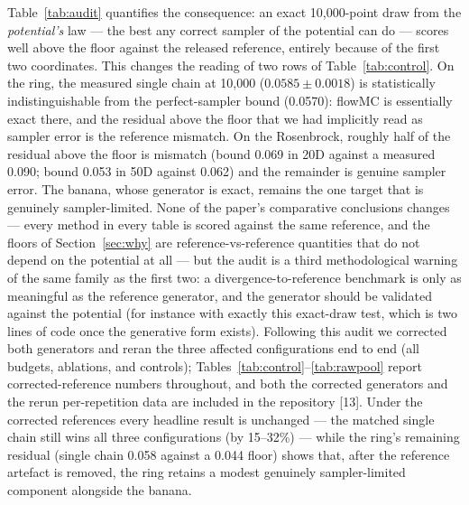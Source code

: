 \documentclass[11pt]{article}
\begin{document}
Table~\ref{tab:audit} quantifies the consequence: an exact 10{,}000-point
draw from the \emph{potential's} law --- the best any correct sampler of the
potential can do --- scores well above the floor against the released
reference, entirely because of the first two coordinates. This changes the
reading of two rows of Table~\ref{tab:control}. On the ring, the measured
single chain at 10{,}000 ($0.0585\pm0.0018$) is statistically
indistinguishable from the perfect-sampler bound (0.0570): flowMC is
essentially exact there, and the residual above the floor that we had
implicitly read as sampler error is the reference mismatch. On the Rosenbrock,
roughly half of the residual above the floor is mismatch (bound 0.069 in 20D
against a measured 0.090; bound 0.053 in 50D against 0.062) and the remainder
is genuine sampler error. The banana, whose generator is exact, remains the
one target that is genuinely sampler-limited. None of the paper's comparative
conclusions changes --- every method in every table is scored against the
same reference, and the floors of Section~\ref{sec:why} are
reference-vs-reference quantities that do not depend on the potential at all
--- but the audit is a third methodological warning of the same family as the
first two: a divergence-to-reference benchmark is only as meaningful as the
reference generator, and the generator should be validated against the
potential (for instance with exactly this exact-draw test, which is two lines
of code once the generative form exists). Following this audit we corrected both generators and reran the three
affected configurations end to end (all budgets, ablations, and controls);
Tables~\ref{tab:control}--\ref{tab:rawpool} report corrected-reference
numbers throughout, and both the corrected generators and the rerun
per-repetition data are included in the repository [13]. Under the corrected
references every headline result is unchanged --- the matched single chain
still wins all three configurations (by 15--32\%) --- while the ring's
remaining residual (single chain 0.058 against a 0.044 floor) shows that,
after the reference artefact is removed, the ring retains a modest genuinely
sampler-limited component alongside the banana.

\begin{table}[htbp]
\centering
\caption{Reference-generator audit. ``Bound'' is the marginal JS of an exact
10{,}000-point draw from the law defined by the \emph{potential}, scored
against the released 20{,}000-point reference (mean of five repetitions):
the best value attainable by a perfect sampler of the potential. The mismatch
is confined to the first two coordinates; the remaining dimensions sit on the
floor. The measured single chain at 10{,}000 (Table~\ref{tab:control}) reaches
the bound on the ring and approaches it on the Rosenbrock.}
\label{tab:audit}
\small

\end{table}
\end{document}
